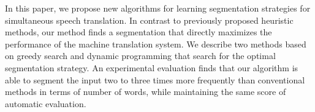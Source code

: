In this paper, we propose new algorithms for learning segmentation strategies for simultaneous speech translation. In contrast to previously proposed heuristic methods, our method finds a segmentation that directly maximizes the performance of the machine translation system. We describe two methods based on greedy search and dynamic programming that search for the optimal segmentation strategy. An experimental evaluation finds that our algorithm is able to segment the input two to three times more frequently than conventional methods in terms of number of words, while maintaining the same score of automatic evaluation.
